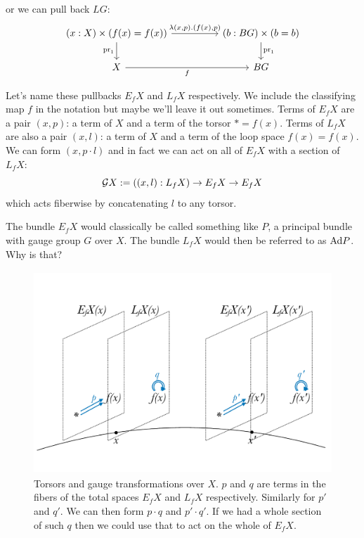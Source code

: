 \documentclass[12pt]{report}
\begin{document}
or we can pull back $LG$:
\[\begin{tikzcd}
	{(x:X)\times (f(x)=f(x))} && {(b:BG)\times (b=b)} \\
	X && BG
	\arrow["{\mathrm{pr}_1}", from=1-3, to=2-3]
	\arrow["{\lambda(x, p).(f(x),p)}", from=1-1, to=1-3]
	\arrow["f"', from=2-1, to=2-3]
	\arrow["{\mathrm{pr}_1}"', from=1-1, to=2-1]
\end{tikzcd}\]

Let's name these pullbacks $E_fX$ and $L_fX$ respectively. We include the classifying map $f$ in the notation but maybe we'll leave it out sometimes. Terms of $E_fX$ are a pair $(x, p)$: a term of $X$ and a term of the torsor $*=f(x)$. Terms of $L_fX$ are also a pair $(x, l)$: a term of $X$ and a term of the loop space $f(x)=f(x)$. We can form $(x, p\cdot l)$ and in fact we can act on all of $E_fX$ with a section of $L_fX$: $$\mathcal{G} X:=((x,l):L_fX)\to E_fX\to E_fX$$ which acts fiberwise by concatenating $l$ to any torsor.

The bundle $E_fX$ would classically be called something like $P$, a principal bundle with gauge group $G$ over $X$. The bundle $L_fX$ would then be referred to as $\mathrm{Ad} P$. Why is that? 

\begin{figure}[htb]
\begin{center}
\includegraphics[height=3in,width=4.5in]{torsors_and_gauge}
\caption{Torsors and gauge transformations over $X$. $p$ and $q$ are terms in the fibers of the total spaces $E_fX$ and $L_fX$ respectively. Similarly for $p'$ and $q'$. We can then form $p\cdot q$ and $p'\cdot q'$. If we had a whole section of such $q$ then we could use that to act on the whole of $E_fX$.}
\end{center}
\end{figure}
\end{document}
